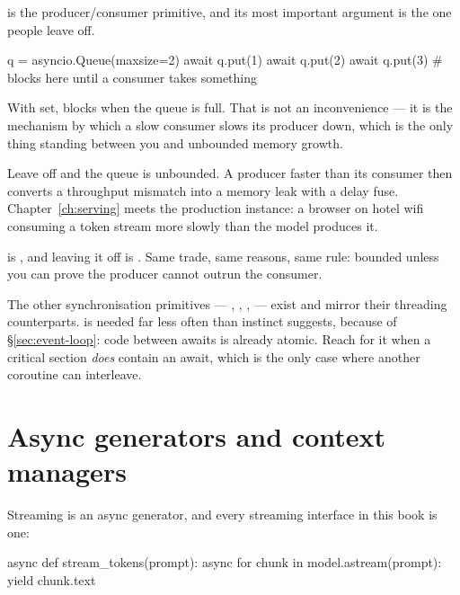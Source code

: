  is the producer/consumer primitive, and its most important
argument is the one people leave off.

\begin{python}[caption={A bounded queue is backpressure}, label={lst:queue}]
q = asyncio.Queue(maxsize=2)
await q.put(1)
await q.put(2)
await q.put(3)     # blocks here until a consumer takes something
\end{python}

With  set,  blocks when the queue is full. That is not an
inconvenience --- it is the mechanism by which a slow consumer slows its producer
down, which is the only thing standing between you and unbounded memory growth.

Leave  off and the queue is unbounded. A producer faster than its
consumer then converts a throughput mismatch into a memory leak with a delay
fuse. Chapter~\ref{ch:serving} meets the production instance: a browser on hotel
wifi consuming a token stream more slowly than the model produces it.

\begin{dotnetbox}
 is , and
leaving it off is . Same trade, same reasons,
same rule: bounded unless you can prove the producer cannot outrun the consumer.
\end{dotnetbox}

The other synchronisation primitives --- , ,
,  --- exist and mirror their threading
counterparts.  is needed far less often than instinct suggests,
because of \S\ref{sec:event-loop}: code between awaits is already atomic. Reach
for it when a critical section \emph{does} contain an await, which is the only
case where another coroutine can interleave.

\section{Async generators and context managers}
\label{sec:async-generators}

Streaming is an async generator, and every streaming interface in this book is
one:

\begin{python}[caption={The shape of every streaming API here}, label={lst:agen}]
async def stream_tokens(prompt):
    async for chunk in model.astream(prompt):
        yield chunk.text
\end{python}

